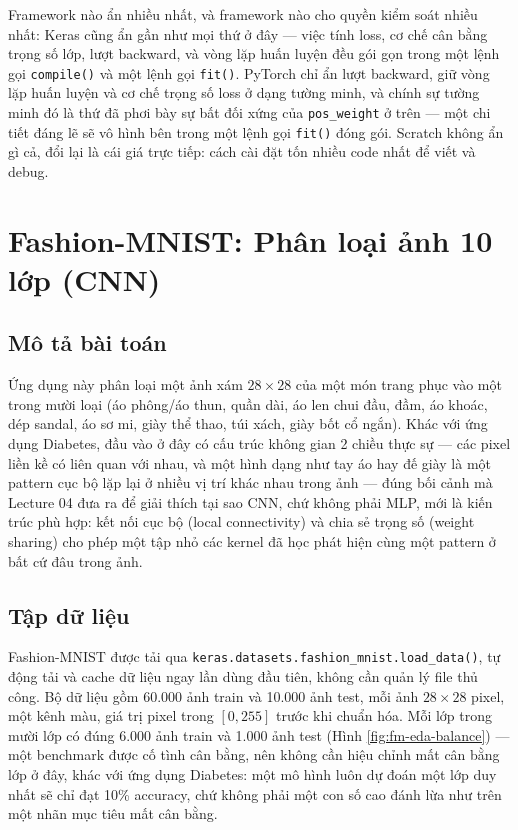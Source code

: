 \documentclass[11pt]{article}
\newcommand{\code}[1]{\texttt{#1}}
\begin{document}
Framework nào ẩn nhiều nhất, và framework nào cho quyền kiểm soát nhiều
nhất: Keras cũng ẩn gần như mọi thứ ở đây — việc tính loss, cơ chế cân bằng
trọng số lớp, lượt backward, và vòng lặp huấn luyện đều gói gọn trong một
lệnh gọi \code{compile()} và một lệnh gọi \code{fit()}. PyTorch chỉ ẩn lượt
backward, giữ vòng lặp huấn luyện và cơ chế trọng số loss ở dạng tường
minh, và chính sự tường minh đó là thứ đã phơi bày sự bất đối xứng của
\code{pos\_weight} ở trên — một chi tiết đáng lẽ sẽ vô hình bên trong một
lệnh gọi \code{fit()} đóng gói. Scratch không ẩn gì cả, đổi lại là cái giá
trực tiếp: cách cài đặt tốn nhiều code nhất để viết và debug.

\newpage
\section{Fashion-MNIST: Phân loại ảnh 10 lớp (CNN)}
\label{sec:fashion}

\subsection{Mô tả bài toán}

Ứng dụng này phân loại một ảnh xám $28\times28$ của một món trang phục vào
một trong mười loại (áo phông/áo thun, quần dài, áo len chui đầu, đầm, áo
khoác, dép sandal, áo sơ mi, giày thể thao, túi xách, giày bốt cổ ngắn).
Khác với ứng dụng Diabetes, đầu vào ở đây có cấu trúc không gian 2 chiều
thực sự — các pixel liền kề có liên quan với nhau, và một hình dạng như
tay áo hay đế giày là một pattern cục bộ lặp lại ở nhiều vị trí khác nhau
trong ảnh — đúng bối cảnh mà Lecture 04 đưa ra để giải thích tại sao CNN,
chứ không phải MLP, mới là kiến trúc phù hợp: kết nối cục bộ (local
connectivity) và chia sẻ trọng số (weight sharing) cho phép một tập nhỏ
các kernel đã học phát hiện cùng một pattern ở bất cứ đâu trong ảnh.

\subsection{Tập dữ liệu}

Fashion-MNIST được tải qua
\code{keras.datasets.fashion\_mnist.load\_data()}, tự động tải và cache dữ
liệu ngay lần dùng đầu tiên, không cần quản lý file thủ công. Bộ dữ liệu
gồm 60.000 ảnh train và 10.000 ảnh test, mỗi ảnh $28\times28$ pixel, một
kênh màu, giá trị pixel trong $[0, 255]$ trước khi chuẩn hóa. Mỗi lớp
trong mười lớp có đúng 6.000 ảnh train và 1.000 ảnh test (Hình
\ref{fig:fm-eda-balance}) — một benchmark được cố tình cân bằng, nên không
cần hiệu chỉnh mất cân bằng lớp ở đây, khác với ứng dụng Diabetes: một mô
hình luôn dự đoán một lớp duy nhất sẽ chỉ đạt 10\% accuracy, chứ không phải
một con số cao đánh lừa như trên một nhãn mục tiêu mất cân bằng.
\end{document}
